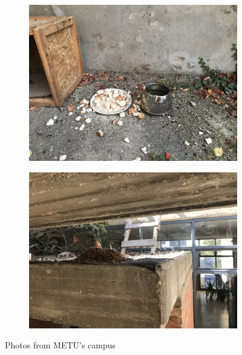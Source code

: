 \begin{figure}[ht]
     \centering
     \begin{subfigure}[b]{0.49\textwidth}
     \includegraphics[width=\linewidth]{img/foodfloor1.jpg}
     \caption{}
     \label{fig:foodfloor0}
     \end{subfigure}
     \begin{subfigure}[b]{0.49\textwidth}
     \includegraphics[width=\linewidth]{img/foodfloor2.jpg}
     \caption {}
     \label{fig:foodfloor1}
     \end{subfigure}        
     \caption{Photos from METU's campus}
     \label{fig:foodfloor}
\end{figure}



